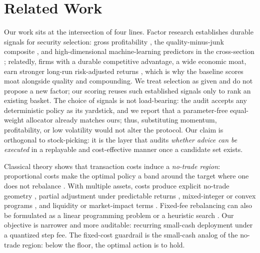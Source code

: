 \documentclass[sigconf,review,anonymous]{acmart}
\begin{document}
\section{Related Work}
\label{sec:related}

Our work sits at the intersection of four lines. Factor research establishes durable signals for security selection: gross profitability \cite{novyMarx2013}, the quality-minus-junk composite \cite{asness2019qmj}, and high-dimensional machine-learning predictors in the cross-section \cite{gu2020machine}; relatedly, firms with a durable competitive advantage, a wide economic moat, earn stronger long-run risk-adjusted returns \cite{kanuri2016moat}, which is why the baseline scores moat alongside quality and compounding. We treat selection as given and do not propose a new factor; our scoring reuses such established signals only to rank an existing basket. The choice of signals is not load-bearing: the audit accepts any deterministic policy as its yardstick, and we report that a parameter-free equal-weight allocator already matches ours; thus, substituting momentum, profitability, or low volatility would not alter the protocol. Our claim is orthogonal to stock-picking: it is the layer that audits \emph{whether advice can be executed} in a replayable and cost-effective manner once a candidate set exists.

Classical theory shows that transaction costs induce a \emph{no-trade region}: proportional costs make the optimal policy a band around the target where one does not rebalance \cite{constantinides1986capital, davis1990portfolio}. With multiple assets, costs produce explicit no-trade geometry \cite{liu2004transaction}, partial adjustment under predictable returns \cite{garleanu2013dynamic}, mixed-integer or convex programs \cite{lobo2007portfolio}, and liquidity or market-impact terms \cite{zhang2019dynamic}. Fixed-fee rebalancing can also be formulated as a linear programming problem or a heuristic search \cite{delarosa2023planning}. Our objective is narrower and more auditable: recurring small-cash deployment under a quantized step fee. The fixed-cost guardrail is the small-cash analog of the no-trade region: below the floor, the optimal action is to hold.
\end{document}
